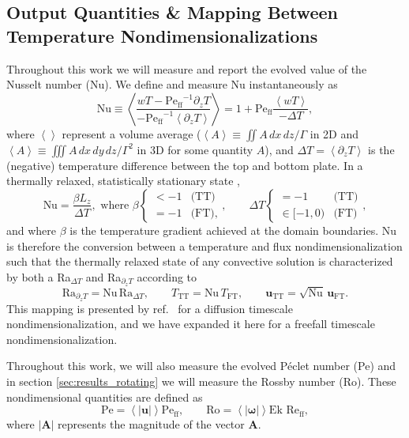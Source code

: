 \documentclass[aps, pre, onecolumn, nofootinbib, notitlepage, groupedaddress, amsfonts, amssymb, amsmath, longbibliography, superscriptaddress]{revtex4-1}
\newcommand{\angles}[1]{\ensuremath{\left\langle #1 \right\rangle}}
\newcommand{\Reff}{\ensuremath{\text{Re}_{\text{ff}}}}
\newcommand{\Peff}{\ensuremath{\text{Pe}_{\text{ff}}}}
\begin{document}
\subsection{Output Quantities \& Mapping Between Temperature Nondimensionalizations}
\label{sec:ra_nu_relations}
Throughout this work we will measure and report the evolved value of the Nusselt number (Nu).
We define and measure Nu instantaneously as
\begin{equation}
\text{Nu} \equiv \angles{\frac{w T - \Peff^{-1} \partial_z T}{-\Peff^{-1} \angles{\partial_z T}}}
= 1 + \Peff\frac{\angles{w T}}{-\Delta T},
\end{equation}
where $\angles{}$ represent a volume average ($\angles{A} \equiv \iint A\,dx\,dz / \Gamma$ in 2D and $\angles{A} \equiv \iiint A\,dx\,dy\,dz / \Gamma^2$ in 3D for some quantity $A$), and $\Delta T = \angles{\partial_z T}$ is the (negative) temperature difference between the top and bottom plate.
In a thermally relaxed, statistically stationary state \cite{calkins&all2015}, 
\begin{equation}
\text{Nu} = \frac{\beta L_z}{\Delta T}, \,\,\text{where}\,\,
\beta \begin{cases}
< -1 & \text{(TT)} \\
= -1 & \text{(FT)},
\end{cases},
\qquad
\Delta T \begin{cases}
= -1 & \text{(TT)} \\
\in [-1, 0) & \text{(FT)}
\end{cases},
\label{eqn:evolved_nu}
\end{equation}
and where $\beta$ is the temperature gradient achieved at the domain boundaries.
Nu is therefore the conversion between a temperature and flux nondimensionalization such that the thermally relaxed state of any convective solution is characterized by both a Ra$_{\Delta T}$ and Ra$_{\partial_z T}$ according to
\begin{equation}
\text{Ra}_{\partial_z T} =\text{Nu}\, \text{Ra}_{\Delta T},
\qquad
T_{\text{TT}} = \text{Nu}\, T_{\text{FT}},
\qquad
\bm{u}_{\text{TT}} = \sqrt{\text{Nu}}\, \bm{u}_{\text{FT}}.
\label{eqn:ra_relation}
\end{equation}
This mapping is presented by ref.~\cite{calkins&all2015} for a diffusion timescale nondimensionalization, and we have expanded it here for a freefall timescale nondimensionalization.



Throughout this work, we will also measure the evolved P\'{e}clet number (Pe) and in section \ref{sec:results_rotating} we will measure the Rossby number (Ro).
These nondimensional quantities are defined as
\begin{equation}
\text{Pe} = \angles{|\bm{u}|}\Peff,\qquad \text{Ro} = \angles{|\bm{\omega}|}\text{Ek }\Reff,
\end{equation}
where $|\bm{A}|$ represents the magnitude of the vector $\bm{A}$.
\end{document}

